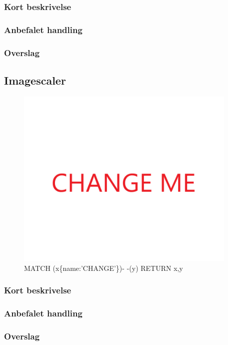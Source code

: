 \documentclass{article}
\begin{document}
\subsubsection{Kort beskrivelse}
\subsubsection{Anbefalet handling}
\subsubsection{Overslag}


\subsection{Imagescaler}
\begin{figure}[h]
\includegraphics[width=300pt]{CHANGE.PNG}
\caption{MATCH (x\{name:'CHANGE'\})- -(y) RETURN x,y}
\end{figure}
\subsubsection{Kort beskrivelse}
\subsubsection{Anbefalet handling}
\subsubsection{Overslag}
\end{document}
